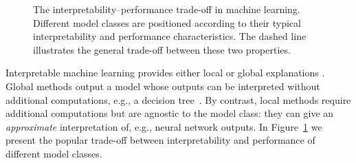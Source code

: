 \begin{figure}[htbp]
    \centering
    \caption{The interpretability–performance trade-off in machine learning. Different model classes are positioned according to their typical interpretability and performance characteristics. The dashed line illustrates the general trade-off between these two properties.}
    \label{fig:interpretability-performance-tradeoff}
\end{figure}
Interpretable machine learning provides either local or global explanations \cite{glanois-survey}.
Global methods output a model whose outputs can be interpreted without additional computations, e.g., a decision tree~\cite{breiman1984classification}. By contrast, local methods require additional computations but are agnostic to the model class: they can give an \textit{approximate} interpretation of, e.g., neural network outputs.
In Figure~\ref{fig:interpretability-performance-tradeoff} we present the popular trade-off between interpretability and performance of different model classes.

